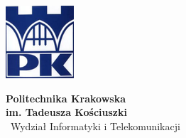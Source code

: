 \thispagestyle{empty}
\begin{titlepage}

  \condTWOSIDE{\changetext{}{19mm}{}{19mm}{}}

  \vspace{1cm}
  \begin{minipage}{0.2\textwidth}
    \includegraphics[width=\linewidth]{gfx/LOGO_UNIVERSITY} \\ 
  \end{minipage}
  \begin{minipage}{0.6\textwidth}
  	\begin{center}
    \textbf{Politechnika Krakowska\\im. Tadeusza Kościuszki}\\
    ~Wydział Informatyki i Telekomunikacji~
	\end{center}
  \end{minipage}
  \begin{minipage}{0.2\textwidth}

\end{minipage}
\end{titlepage}
